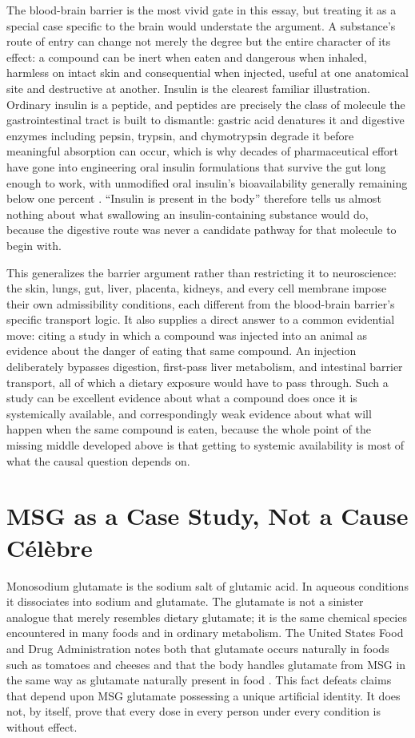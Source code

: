 \documentclass[11pt]{article}
\begin{document}
The blood-brain barrier is the most vivid gate in this essay, but treating it as a special case specific to the brain would understate the argument. A substance's route of entry can change not merely the degree but the entire character of its effect: a compound can be inert when eaten and dangerous when inhaled, harmless on intact skin and consequential when injected, useful at one anatomical site and destructive at another. Insulin is the clearest familiar illustration. Ordinary insulin is a peptide, and peptides are precisely the class of molecule the gastrointestinal tract is built to dismantle: gastric acid denatures it and digestive enzymes including pepsin, trypsin, and chymotrypsin degrade it before meaningful absorption can occur, which is why decades of pharmaceutical effort have gone into engineering oral insulin formulations that survive the gut long enough to work, with unmodified oral insulin's bioavailability generally remaining below one percent \citep{zheng2026insulin}. ``Insulin is present in the body'' therefore tells us almost nothing about what swallowing an insulin-containing substance would do, because the digestive route was never a candidate pathway for that molecule to begin with.

This generalizes the barrier argument rather than restricting it to neuroscience: the skin, lungs, gut, liver, placenta, kidneys, and every cell membrane impose their own admissibility conditions, each different from the blood-brain barrier's specific transport logic. It also supplies a direct answer to a common evidential move: citing a study in which a compound was injected into an animal as evidence about the danger of eating that same compound. An injection deliberately bypasses digestion, first-pass liver metabolism, and intestinal barrier transport, all of which a dietary exposure would have to pass through. Such a study can be excellent evidence about what a compound does once it is systemically available, and correspondingly weak evidence about what will happen when the same compound is eaten, because the whole point of the missing middle developed above is that getting to systemic availability is most of what the causal question depends on.

\section{MSG as a Case Study, Not a Cause C\'el\`ebre}

Monosodium glutamate is the sodium salt of glutamic acid. In aqueous conditions it dissociates into sodium and glutamate. The glutamate is not a sinister analogue that merely resembles dietary glutamate; it is the same chemical species encountered in many foods and in ordinary metabolism. The United States Food and Drug Administration notes both that glutamate occurs naturally in foods such as tomatoes and cheeses and that the body handles glutamate from MSG in the same way as glutamate naturally present in food 
\citep{fda2012msg}. This fact defeats claims that depend upon MSG glutamate possessing a unique artificial identity. It does not, by itself, prove that every dose in every person under every condition is without effect.
\end{document}
